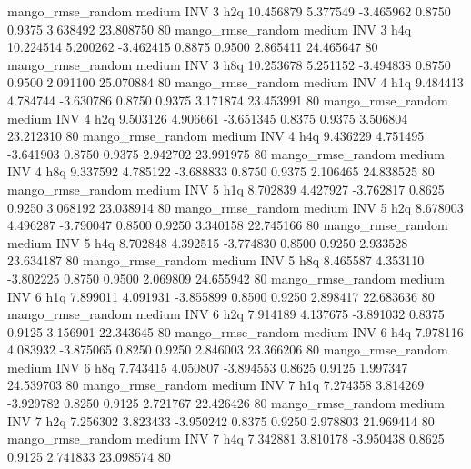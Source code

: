 mango_rmse_random     medium      INV                 3                  h2q 10.456879 5.377549 -3.465962 0.8750 0.9375  3.638492   23.808750 80
mango_rmse_random     medium      INV                 3                  h4q 10.224514 5.200262 -3.462415 0.8875 0.9500  2.865411   24.465647 80
mango_rmse_random     medium      INV                 3                  h8q 10.253678 5.251152 -3.494838 0.8750 0.9500  2.091100   25.070884 80
mango_rmse_random     medium      INV                 4                  h1q  9.484413 4.784744 -3.630786 0.8750 0.9375  3.171874   23.453991 80
mango_rmse_random     medium      INV                 4                  h2q  9.503126 4.906661 -3.651345 0.8375 0.9375  3.506804   23.212310 80
mango_rmse_random     medium      INV                 4                  h4q  9.436229 4.751495 -3.641903 0.8750 0.9375  2.942702   23.991975 80
mango_rmse_random     medium      INV                 4                  h8q  9.337592 4.785122 -3.688833 0.8750 0.9375  2.106465   24.838525 80
mango_rmse_random     medium      INV                 5                  h1q  8.702839 4.427927 -3.762817 0.8625 0.9250  3.068192   23.038914 80
mango_rmse_random     medium      INV                 5                  h2q  8.678003 4.496287 -3.790047 0.8500 0.9250  3.340158   22.745166 80
mango_rmse_random     medium      INV                 5                  h4q  8.702848 4.392515 -3.774830 0.8500 0.9250  2.933528   23.634187 80
mango_rmse_random     medium      INV                 5                  h8q  8.465587 4.353110 -3.802225 0.8750 0.9500  2.069809   24.655942 80
mango_rmse_random     medium      INV                 6                  h1q  7.899011 4.091931 -3.855899 0.8500 0.9250  2.898417   22.683636 80
mango_rmse_random     medium      INV                 6                  h2q  7.914189 4.137675 -3.891032 0.8375 0.9125  3.156901   22.343645 80
mango_rmse_random     medium      INV                 6                  h4q  7.978116 4.083932 -3.875065 0.8250 0.9250  2.846003   23.366206 80
mango_rmse_random     medium      INV                 6                  h8q  7.743415 4.050807 -3.894553 0.8625 0.9125  1.997347   24.539703 80
mango_rmse_random     medium      INV                 7                  h1q  7.274358 3.814269 -3.929782 0.8250 0.9125  2.721767   22.426426 80
mango_rmse_random     medium      INV                 7                  h2q  7.256302 3.823433 -3.950242 0.8375 0.9250  2.978803   21.969414 80
mango_rmse_random     medium      INV                 7                  h4q  7.342881 3.810178 -3.950438 0.8625 0.9125  2.741833   23.098574 80
